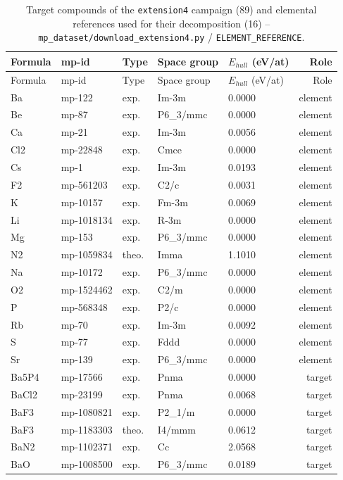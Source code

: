 \begin{longtable}{@{}lllllr@{}}
\caption{Target compounds of the \texttt{extension4} campaign (89) and elemental references used for their decomposition (16) -- \texttt{mp\_dataset/download\_extension4.py} / \texttt{ELEMENT\_REFERENCE}.}\\
\toprule
Formula & mp-id & Type & Space group & $E_{hull}$ (eV/at) & Role \\
\midrule
\endfirsthead
\toprule
Formula & mp-id & Type & Space group & $E_{hull}$ (eV/at) & Role \\
\midrule
\endhead
\bottomrule
\endfoot
Ba & mp-122 & exp. & Im-3m & 0.0000 & element \\
Be & mp-87 & exp. & P6\_3/mmc & 0.0000 & element \\
Ca & mp-21 & exp. & Im-3m & 0.0056 & element \\
Cl2 & mp-22848 & exp. & Cmce & 0.0000 & element \\
Cs & mp-1 & exp. & Im-3m & 0.0193 & element \\
F2 & mp-561203 & exp. & C2/c & 0.0031 & element \\
K & mp-10157 & exp. & Fm-3m & 0.0069 & element \\
Li & mp-1018134 & exp. & R-3m & 0.0000 & element \\
Mg & mp-153 & exp. & P6\_3/mmc & 0.0000 & element \\
N2 & mp-1059834 & theo. & Imma & 1.1010 & element \\
Na & mp-10172 & exp. & P6\_3/mmc & 0.0000 & element \\
O2 & mp-1524462 & exp. & C2/m & 0.0000 & element \\
P & mp-568348 & exp. & P2/c & 0.0000 & element \\
Rb & mp-70 & exp. & Im-3m & 0.0092 & element \\
S & mp-77 & exp. & Fddd & 0.0000 & element \\
Sr & mp-139 & exp. & P6\_3/mmc & 0.0000 & element \\
Ba5P4 & mp-17566 & exp. & Pnma & 0.0000 & target \\
BaCl2 & mp-23199 & exp. & Pnma & 0.0068 & target \\
BaF3 & mp-1080821 & exp. & P2\_1/m & 0.0000 & target \\
BaF3 & mp-1183303 & theo. & I4/mmm & 0.0612 & target \\
BaN2 & mp-1102371 & exp. & Cc & 2.0568 & target \\
BaO & mp-1008500 & exp. & P6\_3/mmc & 0.0189 & target \\

\end{longtable}
